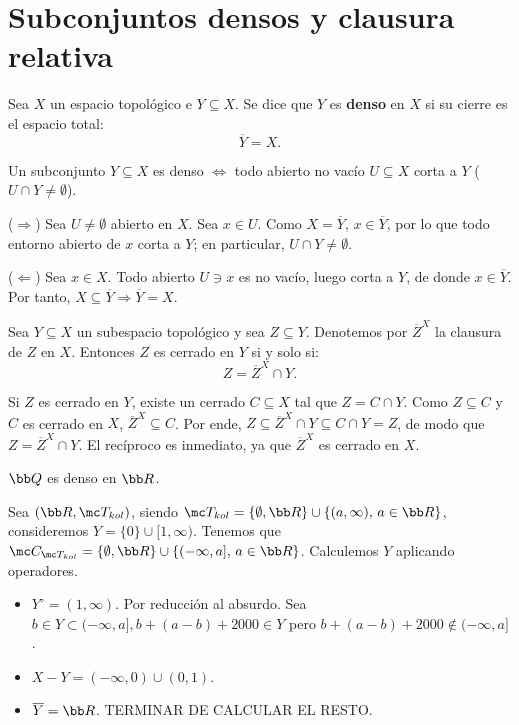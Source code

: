 \section{Subconjuntos densos y clausura relativa}

\begin{defi}
Sea $X$ un espacio topológico e $Y \subseteq X$. Se dice que $Y$ es \textbf{denso} en $X$ si su cierre es el espacio total:
\[
    \overline{Y} = X.
\]
\end{defi}

\begin{prop}
Un subconjunto $Y \subseteq X$ es denso $\iff$ todo abierto no vacío $U \subseteq X$ corta a $Y$ ($U \cap Y \ne \emptyset$).
\end{prop}

\begin{dem}
($\Rightarrow$) Sea $U \ne \emptyset$ abierto en $X$. Sea $x \in U$. Como $X = \overline{Y}$, $x \in \overline{Y}$, por lo que todo entorno abierto de $x$ corta a $Y$; en particular, $U \cap Y \ne \emptyset$.

($\Leftarrow$) Sea $x \in X$. Todo abierto $U \ni x$ es no vacío, luego corta a $Y$, de donde $x \in \overline{Y}$. Por tanto, $X \subseteq \overline{Y} \Rightarrow \overline{Y} = X$.
\end{dem}

\begin{prop}
Sea $Y \subseteq X$ un subespacio topológico y sea $Z \subseteq Y$. Denotemos por $\overline{Z}^X$ la clausura de $Z$ en $X$. Entonces $Z$ es cerrado en $Y$ si y solo si:
\[
    Z = \overline{Z}^X \cap Y.
\]
\end{prop}

\begin{dem}
Si $Z$ es cerrado en $Y$, existe un cerrado $C \subseteq X$ tal que $Z = C \cap Y$. Como $Z \subseteq C$ y $C$ es cerrado en $X$, $\overline{Z}^X \subseteq C$. Por ende, $Z \subseteq \overline{Z}^X \cap Y \subseteq C \cap Y = Z$, de modo que $Z = \overline{Z}^X \cap Y$. El recíproco es inmediato, ya que $\overline{Z}^X$ es cerrado en $X$.
\end{dem}
\begin{ejem}
    $\bb Q$ es denso en $\bb R$.
\end{ejem}
\begin{ejem}
    Sea $(\bb R, \mc T_{kol})$, siendo $\mc T_{kol} = \{\emptyset, \bb R\} \cup \{(a,\infty), \, a \in \bb R\}$, consideremos $Y = \{0\} \cup [1,\infty)$. Tenemos que $\mc C_{\mc T_{kol}}= \{\emptyset, \bb R\} \cup\{(-\infty, a] , \, a\in \bb R\}$. Calculemos $Y$ aplicando operadores.
    \begin{itemize}
        \item $Y^{\circ} = (1, \infty)$. Por reducción al absurdo. Sea $b \in Y \subset (-\infty, a], b+(a-b)+2000 \in Y$ pero $b+(a-b)+2000 \nin (-\infty, a]$. 
        \item $X-Y = (-\infty, 0) \cup (0,1)$.
        \item $\overline{Y} = \bb R$. TERMINAR DE CALCULAR EL RESTO. 
    \end{itemize}
\end{ejem}



